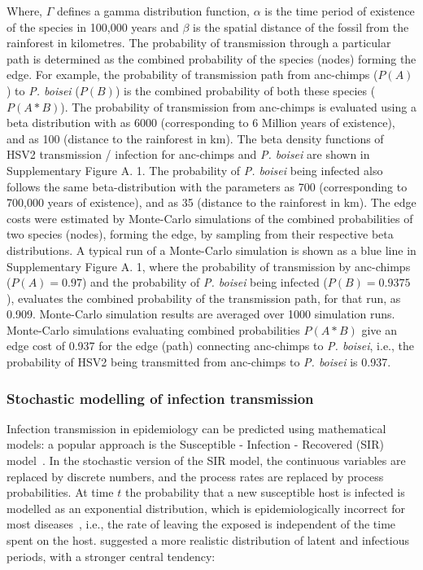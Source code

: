 \documentclass[fleqn,10pt]{wlscirep}
\begin{document}
Where, $\Gamma$ defines a gamma distribution function, $\alpha$ is the time period of existence of the species in 100,000 years and $\beta$ is the spatial distance of the fossil from the rainforest in kilometres. The probability of transmission through a particular path is determined as the combined probability of the species (nodes) forming the edge. For example, the probability of transmission path from anc-chimps ($P(A)$) to \textit{P. boisei} ($P(B)$) is the combined probability of both these species ($P(A*B)$). The probability of transmission from anc-chimps is evaluated using a beta distribution with as 6000 (corresponding to 6 Million years of existence), and  as 100 (distance to the rainforest in km). The beta density functions of HSV2 transmission / infection for anc-chimps and \textit{P. boisei} are shown in Supplementary Figure A. 1. The probability of \textit{P. boisei} being infected also follows the same beta-distribution with the parameters as 700 (corresponding to 700,000 years of existence), and  as 35 (distance to the rainforest in km). The edge costs were estimated by Monte-Carlo simulations of the combined probabilities of two species (nodes), forming the edge, by sampling from their respective beta distributions. A typical run of a Monte-Carlo simulation is shown as a blue line in Supplementary Figure A. 1, where the probability of transmission by anc-chimps ($P(A) = 0.97$) and the probability of \textit{P. boisei} being infected ($P(B) = 0.9375$), evaluates the combined probability of the transmission path, for that run, as 0.909.  Monte-Carlo simulation results are averaged over 1000 simulation runs. Monte-Carlo simulations evaluating combined probabilities $P(A*B)$ give an edge cost of 0.937 for the edge (path) connecting anc-chimps to \textit{P. boisei}, i.e., the probability of HSV2 being transmitted from anc-chimps to \textit{P. boisei} is 0.937.
 

\subsubsection*{Stochastic modelling of infection transmission}
Infection transmission in epidemiology can be predicted using mathematical models: a popular approach is the Susceptible - Infection - Recovered (SIR) model~\citep{Chen2008}. In the stochastic version of the SIR model, the continuous variables are replaced by discrete numbers, and the process rates are replaced by process probabilities. At time $t$ the probability that a new susceptible host is infected is modelled as an exponential distribution, which is epidemiologically incorrect for most diseases~\citep{Wearing2005,Bailey1975,sartwell1950distribution}, i.e., the rate of leaving the exposed is independent of the time spent on the host. \citet{Wearing2005} suggested a more realistic distribution of latent and infectious periods, with a stronger central tendency:
\end{document}
